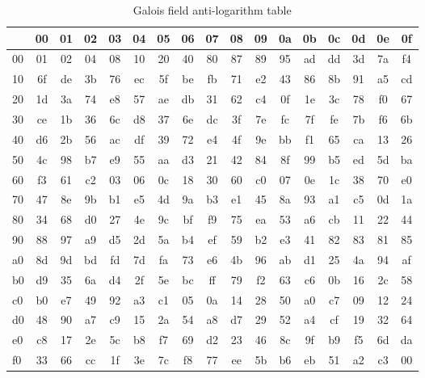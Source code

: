 \bigskip

\begin{table}
\begin{center}
\begin{tabular}{|l||c|c|c|c|c|c|c|c|c|c|c|c|c|c|c|c|}
\hline
&  00 & 01 & 02 & 03 & 04 & 05 & 06 & 07 & 08 & 09 & 0a & 0b & 0c & 0d & 0e & 0f \\
\hline
\hline
00 &  01 & 02 & 04 & 08 & 10 & 20 & 40 & 80 & 87 & 89 & 95 & ad & dd & 3d & 7a & f4 \\
\hline
10 &  6f & de & 3b & 76 & ec & 5f & be & fb & 71 & e2 & 43 & 86 & 8b & 91 & a5 & cd \\
\hline
20 &  1d & 3a & 74 & e8 & 57 & ae & db & 31 & 62 & c4 & 0f & 1e & 3c & 78 & f0 & 67 \\
\hline
30 &  ce & 1b & 36 & 6c & d8 & 37 & 6e & dc & 3f & 7e & fc & 7f & fe & 7b & f6 & 6b \\
\hline
40 &  d6 & 2b & 56 & ac & df & 39 & 72 & e4 & 4f & 9e & bb & f1 & 65 & ca & 13 & 26 \\
\hline
50 &  4c & 98 & b7 & e9 & 55 & aa & d3 & 21 & 42 & 84 & 8f & 99 & b5 & ed & 5d & ba \\
\hline
60 &  f3 & 61 & c2 & 03 & 06 & 0c & 18 & 30 & 60 & c0 & 07 & 0e & 1c & 38 & 70 & e0 \\
\hline
70 &  47 & 8e & 9b & b1 & e5 & 4d & 9a & b3 & e1 & 45 & 8a & 93 & a1 & c5 & 0d & 1a \\
\hline
80 &  34 & 68 & d0 & 27 & 4e & 9c & bf & f9 & 75 & ea & 53 & a6 & cb & 11 & 22 & 44 \\
\hline
90 &  88 & 97 & a9 & d5 & 2d & 5a & b4 & ef & 59 & b2 & e3 & 41 & 82 & 83 & 81 & 85 \\
\hline
a0 &  8d & 9d & bd & fd & 7d & fa & 73 & e6 & 4b & 96 & ab & d1 & 25 & 4a & 94 & af \\
\hline
b0 &  d9 & 35 & 6a & d4 & 2f & 5e & bc & ff & 79 & f2 & 63 & c6 & 0b & 16 & 2c & 58 \\
\hline
c0 &  b0 & e7 & 49 & 92 & a3 & c1 & 05 & 0a & 14 & 28 & 50 & a0 & c7 & 09 & 12 & 24 \\
\hline
d0 &  48 & 90 & a7 & c9 & 15 & 2a & 54 & a8 & d7 & 29 & 52 & a4 & cf & 19 & 32 & 64 \\
\hline
e0 &  c8 & 17 & 2e & 5c & b8 & f7 & 69 & d2 & 23 & 46 & 8c & 9f & b9 & f5 & 6d & da \\
\hline
f0 &  33 & 66 & cc & 1f & 3e & 7c & f8 & 77 & ee & 5b & b6 & eb & 51 & a2 & c3 & 00 \\
\hline
\end{tabular}
\end{center}
\caption{Galois field anti-logarithm table}
\label{anti-log-table}
\end{table}
